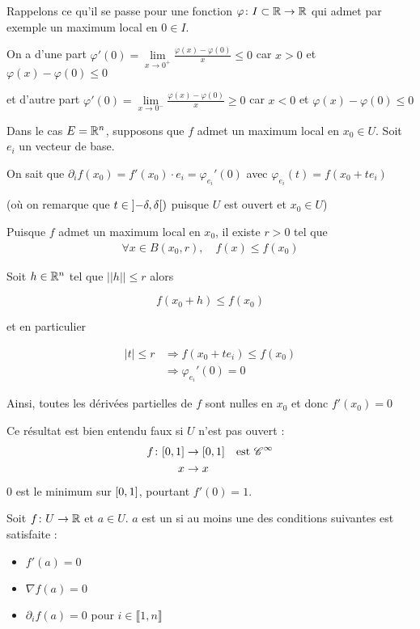 \documentclass[french,a4paper,10pt]{article}
\begin{document}
	\begin{oc-proof}
		Rappelons ce qu'il se passe pour une fonction $\varphi\colon I\subset \mathbb{R}\to\mathbb{R}$ qui admet par exemple un maximum local en $0\in I$.
		
		On a d'une part $\varphi'(0)=\lim\limits_{x\to0^+}\frac{\varphi(x)-\varphi(0)}x\le 0$
		car $x>0$ et $\varphi(x)-\varphi(0)\le 0$
		
		et d'autre part $\varphi'(0)=\lim\limits_{x\to0^-}\frac{\varphi(x)-\varphi(0)}x\ge 0$ car $x<0$ et $\varphi(x)-\varphi(0)\le 0$
		
		Dans le cas $E=\mathbb{R}^n$, supposons que $f$ admet un maximum local en $x_0\in U$. Soit $e_i$ un vecteur de base.
		
		On sait que $\partial_i f(x_0)=f'(x_0)\cdot e_i=\varphi_{e_i}'(0)$ avec $\varphi_{e_i}(t)=f(x_0+te_i)$
		
		(où on remarque que $t\in\mathopen{]}-\delta,\delta\mathclose{[})$ puisque $U$ est ouvert et $x_0\in U$)
		
		Puisque $f$ admet un maximum local en $x_0$, il existe $r>0$ tel que
		\[\begin{aligned}
			\forall x\in B(x_0, r),\quad f(x)\le f(x_0)
		\end{aligned}\]
	
		Soit $h\in\mathbb{R}^n$ tel que $||h||\le r$ alors
		
		\[
		f(x_0+h)\le f(x_0)
		\]
		
		et en particulier
		
		\[\begin{aligned}
			|t|\le r&\Longrightarrow f(x_0+t e_i)\le f(x_0)\\
			&\Longrightarrow\varphi_{e_i}'(0)=0
		\end{aligned}\]
	
		Ainsi, toutes les dérivées partielles de $f$ sont nulles en $x_0$ et donc $f'(x_0)=0$
		
	\end{oc-proof}
	\begin{oc-remark}
		Ce résultat est bien entendu faux si $U$ n'est pas ouvert :
			\[\begin{aligned}
				f\colon\mathopen{[}0, 1\mathclose{]}&\to\mathopen{[}0, 1\mathclose{]}\quad\text{est }\mathscr{C}^\infty\\
				x&\to x
			\end{aligned}\]
		0 est le minimum sur $\mathopen{[}0, 1\mathclose{]}$, pourtant $f'(0)=1$.
	\end{oc-remark}
	\begin{oc-definition}
		Soit $f\colon U\to\mathbb{R}$ et $a\in U$. $a$ est un  si au moins une des conditions suivantes est satisfaite :
		\begin{itemize}
			\item $f'(a)=0$
			\item $\nabla f(a)=0$
			\item $\partial_i f(a)=0$ pour $i\in\llbracket1,n\rrbracket$
		\end{itemize}
		
	\end{oc-definition}
\end{document}
